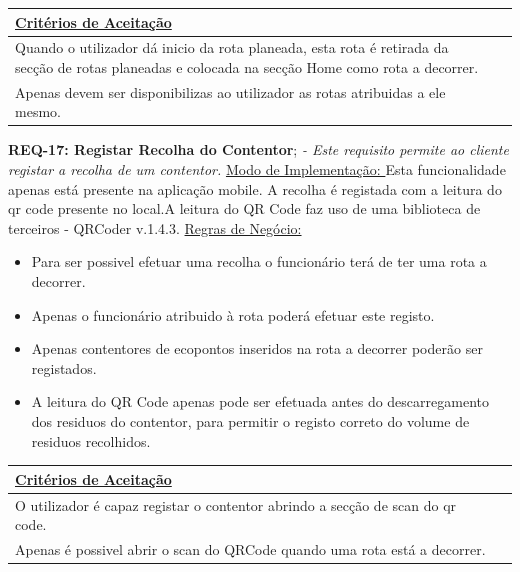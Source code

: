 \documentclass{scrreprt}
\begin{document}
	\begin{tabular}{|p{5.8in}|p{0.7in}|} \hline 
	\underline{Critérios de Aceitação} \\ \hline 
	Quando o utilizador dá inicio da rota planeada, esta rota é retirada da secção de rotas planeadas e colocada na secção Home como rota a decorrer.\\ \hline
	Apenas devem ser disponibilizas ao utilizador as rotas atribuidas a ele mesmo.\\ \hline
	\end{tabular}\newline\newline
	
	\textbf{REQ-17: Registar Recolha do Contentor};\newline
	\textit{- Este requisito permite ao cliente registar a recolha de um contentor.}
	 \newline\newline
	\underline{Modo de Implementação: }Esta funcionalidade apenas está presente na aplicação mobile. A recolha é registada com a leitura do qr code presente no local.A leitura do QR Code faz uso de uma biblioteca de terceiros - QRCoder v.1.4.3.  \newline\newline
	\underline{Regras de Negócio: }
		\begin{itemize}
		\item Para ser possivel efetuar uma recolha o funcionário terá de ter uma rota a decorrer.
		\item Apenas o funcionário atribuido à rota poderá efetuar este registo.
	    \item Apenas contentores de ecopontos inseridos na rota a decorrer poderão ser registados.
		\item A leitura do QR Code apenas pode ser efetuada antes do descarregamento dos residuos do contentor, para permitir o registo correto do volume de residuos recolhidos.
	\end{itemize}
	
	\begin{tabular}{|p{5.8in}|p{0.7in}|} \hline 
	\underline{Critérios de Aceitação} \\ \hline 
	O utilizador é capaz registar o contentor abrindo a secção de scan do qr code. \\ \hline
	Apenas é possivel abrir o scan do QRCode quando uma rota está a decorrer.\\ \hline
	\end{tabular}\newline\newline
	
\end{document}
